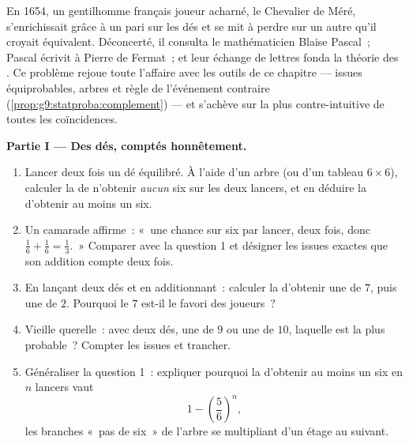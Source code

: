 \begin{problem}
\label{pb:g9:statproba:1}
En 1654, un gentilhomme français joueur acharné, le Chevalier de
Méré, s'enrichissait grâce à un pari sur les dés et se mit à perdre
sur un autre qu'il croyait équivalent. Déconcerté, il consulta le
mathématicien Blaise Pascal~; Pascal écrivit à Pierre de Fermat~; et
leur échange de lettres fonda la théorie des . Ce
problème rejoue toute l'affaire avec les outils de ce chapitre ---
issues équiprobables, arbres et règle de l'événement contraire
(\cref{prop:g9:statproba:complement}) --- et s'achève sur la plus
contre-intuitive de toutes les coïncidences.

\medskip
\noindent\textbf{Partie I --- Des dés, comptés honnêtement.}
\begin{enumerate}
  \item Lancer deux fois un dé équilibré. À l'aide d'un arbre (ou
        d'un tableau $6 \times 6$), calculer la  de
        n'obtenir \emph{aucun} six sur les deux lancers, et en
        déduire la  d'obtenir au moins un six.
  \item Un camarade affirme~: «~une chance sur six par lancer, deux
        fois, donc $\frac16 + \frac16 = \frac13$.~» Comparer avec la
        question 1 et désigner les issues exactes que son addition
        compte deux fois.
  \item En lançant deux dés et en additionnant~: calculer la
         d'obtenir une  de $7$, puis une  de
        $2$. Pourquoi le $7$ est-il le favori des joueurs~?
  \item Vieille querelle~: avec deux dés, une  de $9$ ou une
         de $10$, laquelle est la plus probable~? Compter les
        issues et trancher.
  \item Généraliser la question 1~: expliquer pourquoi la
         d'obtenir au moins un six en $n$ lancers vaut
        \[
        1 - \left(\frac56\right)^{\!n} ,
        \]
        les branches «~pas de six~» de l'arbre se multipliant d'un
        étage au suivant.
\end{enumerate}


\end{problem}

